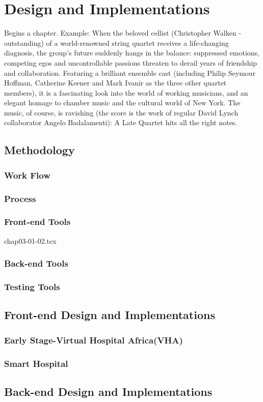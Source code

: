 %
%
\chapter{Design and Implementations}
\label{chap:D&I}

Begins a chapter. Example: When the beloved cellist (Christopher Walken - outstanding) of a world-renowned string quartet receives a life-changing diagnosis, the group's future suddenly hangs in the balance: suppressed emotions, competing egos and uncontrollable passions threaten to derail years of friendship and collaboration. Featuring a brilliant ensemble cast (including Philip Seymour Hoffman, Catherine Keener and Mark Ivanir as the three other quartet members), it is a fascinating look into the world of working musicians, and an elegant homage to chamber music and the cultural world of New York. The music, of course, is ravishing (the score is the work of regular David Lynch collaborator Angelo Badalamenti): A Late Quartet hits all the right notes.

\section{Methodology}
\label{sec:sec01}

\subsection{Work Flow}
\label{subsec:subsec01}

\subsection{Process}
\label{subsec:subsec02}

\subsection{Front-end Tools}
\label{subsec:FETools}
{chap03-01-02.tex}

\subsection{Back-end Tools}
\label{subsec:subsec04}

\subsection{Testing Tools}
\label{subsec:subsec05}

\section{Front-end Design and Implementations}
\label{sec:sec02}

\subsection{Early Stage-Virtual Hospital Africa(VHA)}
\label{subsec:subsec01}

\subsection{Smart Hospital}
\label{subsec:subsec02}

\section{Back-end Design and Implementations}
\label{sec:sec03}